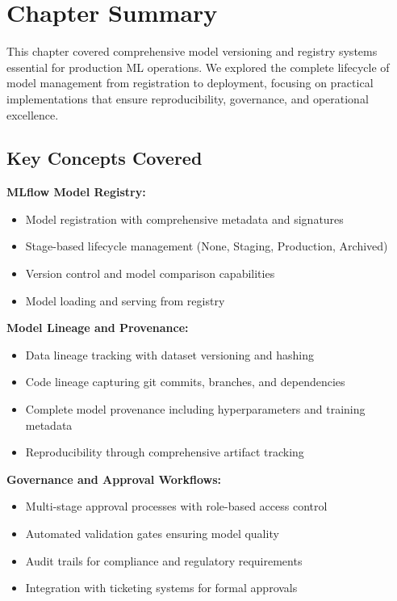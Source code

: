 \section{Chapter Summary}

This chapter covered comprehensive model versioning and registry systems essential for production ML operations. We explored the complete lifecycle of model management from registration to deployment, focusing on practical implementations that ensure reproducibility, governance, and operational excellence.

\subsection{Key Concepts Covered}

\textbf{MLflow Model Registry:}
\begin{itemize}
    \item Model registration with comprehensive metadata and signatures
    \item Stage-based lifecycle management (None, Staging, Production, Archived)
    \item Version control and model comparison capabilities
    \item Model loading and serving from registry
\end{itemize}

\textbf{Model Lineage and Provenance:}
\begin{itemize}
    \item Data lineage tracking with dataset versioning and hashing
    \item Code lineage capturing git commits, branches, and dependencies
    \item Complete model provenance including hyperparameters and training metadata
    \item Reproducibility through comprehensive artifact tracking
\end{itemize}

\textbf{Governance and Approval Workflows:}
\begin{itemize}
    \item Multi-stage approval processes with role-based access control
    \item Automated validation gates ensuring model quality
    \item Audit trails for compliance and regulatory requirements
    \item Integration with ticketing systems for formal approvals
\end{itemize}

